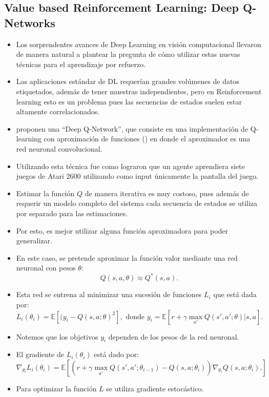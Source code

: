 \documentclass[11pt]{article}
\theoremstyle{plain}
\begin{document}
\subsection{Value based Reinforcement Learning: Deep Q-Networks}
	\begin{itemize}
	\item Los sorprendentes avances de Deep Learning en visión computacional llevaron de manera natural a plantear la pregunta de cómo utilizar estas nuevas técnicas para el aprendizaje por refuerzo. 
	\item Las aplicaciones estándar de DL requerían grandes volúmenes de datos etiquetados, además de tener muestras independientes, pero en Reinforcement learning esto es un problema pues las secuencias de estados suelen estar altamente correlacionados.
	\item \cite{mnih2013playing} proponen una “Deep Q-Network”, que consiste en una implementación de Q-learning con aproximación de funciones (\cite{sutton1998reinforcement}) en donde el aproximador es una red neuronal convolucional.
	  \item Utilizando esta técnica fue como \cite{mnih2013playing} lograron que un agente aprendiera siete juegos de Atari 2600 utilizando como input únicamente la pantalla del juego. 
	  \item Estimar la función $Q$ de manera iterativa es muy costoso, pues además de requerir un modelo completo del sistema cada secuencia de estados se utiliza por separado para las estimaciones.
	  \item Por esto, es mejor utilizar alguna función aproximadora para poder generalizar. 
	   \item En este caso, se pretende aproximar la función valor mediante una red neuronal con pesos $\theta$:
	   \[Q(s,a,\theta) \approx Q^\ast(s,a). \]
	   \item Esta red se entrena al minimizar una sucesión de funciones $L_i$ que está dada por:
	   \[ L_i (\theta_i) = \mathbb{E}[(y_i - Q(s,a;\theta)^2], \textrm{ donde  }y_i = \mathbb{E}[r + \gamma \max_{a'} Q(s',a';\theta) | s,a]. \]
	   \item Notemos que los objetivos $y_i$ dependen de los pesos de la red neuronal. 
	   \item El gradiente de $L_i (\theta_i)$ está dado por:
	   \[ \nabla_{\theta_i} L_i (\theta_i) = \mathbb{E}[(r + \gamma \max_{a'} Q(s',a';\theta_{i-1}) - Q(s,a;\theta_i)) \nabla_{\theta_i} Q(s,a;\theta_i).] \]
	   \item Para optimizar la función $L$ se utiliza gradiente estocástico.

\end{itemize}
\end{document}
